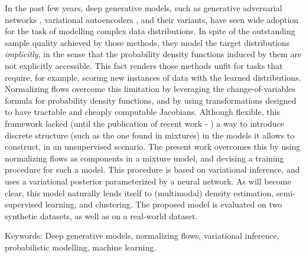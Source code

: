 In the past few years, deep generative models, such as generative adversarial networks
\autocite{GAN}, variational autoencoders \autocite{vaepaper}, and their variants,
have seen wide adoption for the task of modelling complex data distributions.
In spite of the outstanding sample quality achieved by those methods,
they model the target distributions \emph{implicitly}, in the sense that the probability
density functions induced by them are not explicitly accessible. This fact renders those methods unfit for
tasks that require, for example, scoring new instances of data with the learned
distributions. Normalizing flows overcome this limitation by leveraging the
change-of-variables formula for probability density functions, and by using
transformations designed to have tractable and cheaply computable Jacobians. Although
flexible, this framework lacked (until the publication of recent work -
\autocites{semisuplearning_nflows, RAD}) a way to introduce discrete
structure (such as the one found in mixtures) in the models it allows to
construct, in an unsupervised scenario. The present work overcomes this by using normalizing flows as components in a mixture model,
and devising a training procedure for such a model.
This procedure is based on variational inference, and uses a variational posterior
parameterized by a neural network. As will become clear, this model naturally
lends itself to (multimodal) density estimation, semi-supervised learning, and
clustering. The proposed model is evaluated on two synthetic datasets, as well
as on a real-world dataset.

\vspace{5mm}
Keywords: Deep generative models, normalizing flows, variational
inference, probabilistic modelling, machine learning.

